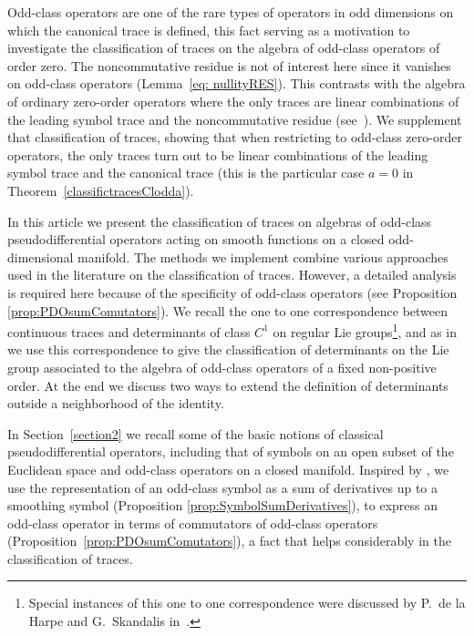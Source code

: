 \documentclass[pdftex]{sigma}
\begin{document}
Odd-class operators are one of the rare types of operators in odd dimensions on which the canonical trace is def\/ined, this fact serving as a motivation to investigate the classif\/ication of traces on the algebra of odd-class operators of order zero. The noncommutative residue is not of interest here since it vanishes on odd-class operators (Lemma~\ref{eq: nullityRES}). This contrasts with the algebra of ordinary zero-order operators where the only traces are linear combinations of the leading symbol trace and the noncommutative residue (see~\cite{lescure}). We supplement that classif\/ication of traces, showing that when restricting to odd-class zero-order operators, the only traces turn out to be linear combinations of the leading symbol trace and the canonical trace (this is the particular case $a=0$ in Theorem~\ref{classifictracesClodda}).

In this article we present the classif\/ication of traces on algebras of odd-class pseudodif\/ferential operators acting on smooth functions on a closed odd-dimensional manifold. The methods we implement combine various approaches used in the literature on the classif\/ication of traces. However, a detailed analysis is required here because of the specif\/icity of odd-class operators (see Proposition \ref{prop:PDOsumComutators}). We recall the one to one correspondence between continuous traces and determinants of class $C^1$ on regular Lie groups\footnote{Special instances of this one to one correspondence were discussed by P.~de la Harpe and G.~Skandalis in~\cite{HarpeSkandalis}.}, and as in \cite{lescure} we use this correspondence to give the classif\/ication of determinants on the Lie group associated to the algebra of odd-class operators of a f\/ixed non-positive order. At the end we discuss two ways to extend the def\/inition of determinants outside a neighborhood of the identity.

In Section~\ref{section2} we recall some of the basic notions of classical pseudodif\/ferential operators, including that of symbols on an open subset of the Euclidean space and odd-class operators on a closed manifold. Inspired by \cite{maniccia}, we use the representation of an odd-class symbol as a sum of derivatives up to a smoothing symbol (Proposition \ref{prop:SymbolSumDerivatives}), to express an odd-class operator in terms of commutators of odd-class operators (Proposition~\ref{prop:PDOsumComutators}), a fact that helps considerably in the classif\/ication of traces.
\end{document}
